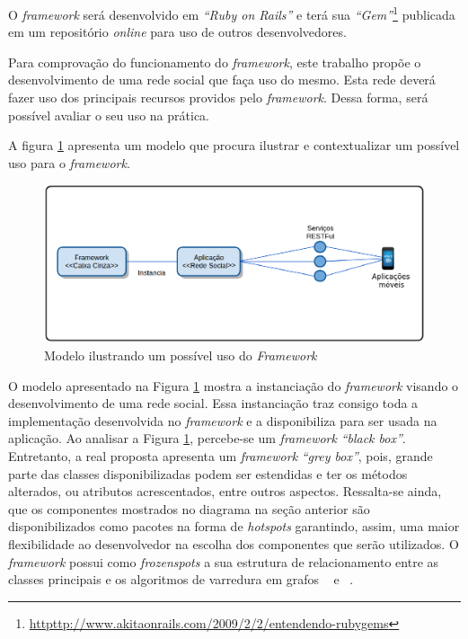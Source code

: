 O \textit{framework} será desenvolvido em \textit{``Ruby on Rails''} e terá sua \textit{``Gem''}\footnote{\url{httpttp://www.akitaonrails.com/2009/2/2/entendendo-rubygems}} publicada em um repositório \textit{online} para uso de outros desenvolvedores.

Para comprovação do funcionamento do \textit{framework}, este trabalho propõe o desenvolvimento de uma rede social que faça uso do mesmo. Esta rede deverá fazer uso dos principais recursos providos pelo \textit{framework}. Dessa forma, será possível avaliar o seu uso na prática.

A figura \ref{uso_proposto} apresenta um modelo que procura ilustrar e contextualizar um possível uso para o \textit{framework}.

\begin{figure}[!h]
	\centering
	\includegraphics[scale=0.45]{figuras/capitulo5/uso_proposto.eps}
	\caption{Modelo ilustrando um possível uso do \textit{Framework}}
	\label{uso_proposto}
\end{figure}

O modelo apresentado na Figura \ref{uso_proposto} mostra a instanciação do \textit{framework}  visando o desenvolvimento de uma rede social. Essa instanciação traz consigo toda a implementação desenvolvida no \textit{framework} e a disponibiliza para ser usada na aplicação. Ao analisar a Figura \ref{uso_proposto}, percebe-se um \textit{framework} \textit{``black box''}. Entretanto, a real proposta apresenta um \textit{framework} \textit{``grey box''}, pois, grande parte das classes disponibilizadas podem ser estendidas e ter os métodos alterados, ou atributos acrescentados, entre outros aspectos. Ressalta-se ainda, que os componentes mostrados no diagrama na seção anterior são disponibilizados como pacotes na forma de \textit{hotspots} \cite{Franca:2001} garantindo, assim, uma maior flexibilidade ao desenvolvedor na escolha dos componentes que serão utilizados. O \textit{framework} possui como \textit{frozenspots} \cite{Franca:2001} a sua estrutura de relacionamento entre as classes principais e os algoritmos de varredura em grafos ~ e ~.

